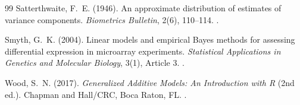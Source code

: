 \documentclass[11pt,twoside,openright]{book}
\begin{document}
\begin{thebibliography}{99}
Satterthwaite, F.~E. (1946). An approximate distribution of estimates of variance components. \textit{Biometrics Bulletin}, 2(6), 110--114. .

Smyth, G.~K. (2004). Linear models and empirical Bayes methods for assessing differential expression in microarray experiments. \textit{Statistical Applications in Genetics and Molecular Biology}, 3(1), Article 3. .

Wood, S.~N. (2017). \textit{Generalized Additive Models: An Introduction with R} (2nd ed.). Chapman and Hall/CRC, Boca Raton, FL. .

\end{thebibliography}
\end{document}

